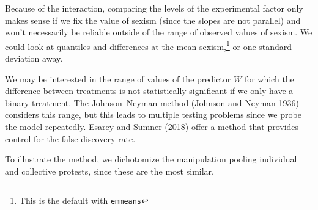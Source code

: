 \documentclass[
  11pt,
  letterpaper,
]{scrbook}
\newenvironment{Shaded}{\begin{snugshade}}{\end{snugshade}}
\newcommand{\AttributeTok}[1]{\textcolor[rgb]{0.40,0.45,0.13}{#1}}
\newcommand{\CommentTok}[1]{\textcolor[rgb]{0.37,0.37,0.37}{#1}}
\newcommand{\ConstantTok}[1]{\textcolor[rgb]{0.56,0.35,0.01}{#1}}
\newcommand{\FunctionTok}[1]{\textcolor[rgb]{0.28,0.35,0.67}{#1}}
\newcommand{\NormalTok}[1]{\textcolor[rgb]{0.00,0.23,0.31}{#1}}
\newcommand{\OtherTok}[1]{\textcolor[rgb]{0.00,0.23,0.31}{#1}}
\newcommand{\SpecialCharTok}[1]{\textcolor[rgb]{0.37,0.37,0.37}{#1}}
\newcommand{\StringTok}[1]{\textcolor[rgb]{0.13,0.47,0.30}{#1}}
\theoremstyle{definition}
\theoremstyle{remark}
\begin{document}
Because of the interaction, comparing the levels of the experimental
factor only makes sense if we fix the value of sexism (since the slopes
are not parallel) and won't necessarily be reliable outside of the range
of observed values of sexism. We could look at quantiles and differences
at the mean sexism,\footnote{This is the default with \texttt{emmeans}}
or one standard deviation away.

We may be interested in the range of values of the predictor \(W\) for
which the difference between treatments is not statistically significant
if we only have a binary treatment. The Johnson--Neyman method
(\protect\hyperlink{ref-Johnson.Neyman:1936}{Johnson and Neyman 1936})
considers this range, but this leads to multiple testing problems since
we probe the model repeatedly. Esarey and Sumner
(\protect\hyperlink{ref-Esarey.Sumner:2018}{2018}) offer a method that
provides control for the false discovery rate.

To illustrate the method, we dichotomize the manipulation pooling
individual and collective protests, since these are the most similar.

\begin{Shaded}
\end{Shaded}
\end{document}
